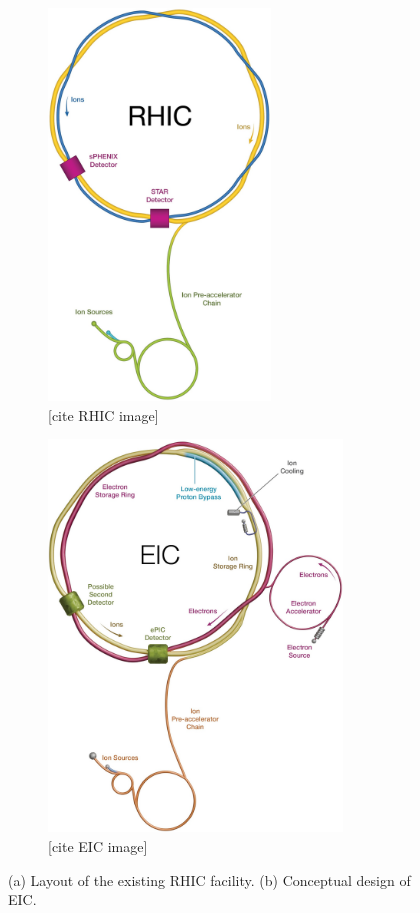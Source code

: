 \begin{figure}[H]
    \begin{subfigure}{0.4\linewidth}
        \includegraphics[height=10.4cm]{img/rhic.jpg}
        \caption{[cite RHIC image]}
        \label{fig:eic:comparison::rhic}
    \end{subfigure}
    \raisebox{20\height}{\Huge$\rightarrow$}
    \begin{subfigure}{0.52\linewidth}
        \includegraphics[height=10.4cm]{img/eic.jpg}
        \caption{[cite EIC image]}
        \label{fig:eic:comparison::eic}
    \end{subfigure}
    \caption{(a) Layout of the existing RHIC facility. (b) Conceptual design of EIC.}
    \label{fig:eic:comparison}
\end{figure}


